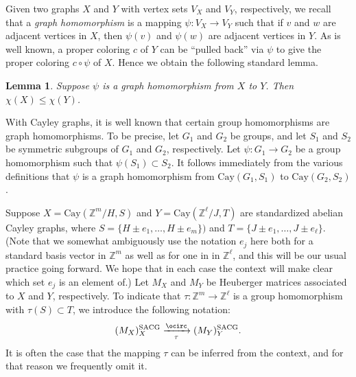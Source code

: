 \documentclass{article}
\newtheorem{Lem}[Thm]{Lemma}
\theoremstyle{definition}
\theoremstyle{remark}
\begin{document}
Given two graphs $X$ and $Y$ with vertex sets $V_X$ and $V_Y$, respectively, we recall that a \emph{graph homomorphism} is a mapping $\psi\colon V_X\to V_Y$ such that if $v$ and $w$ are adjacent vertices in $X$, then $\psi(v)$ and $\psi(w)$ are adjacent vertices in $Y$.  As is well known, a proper coloring $c$ of $Y$ can be ``pulled back'' via $\psi$ to give the proper coloring $c\circ\psi$ of $X$.  Hence we obtain the following standard lemma.

\begin{Lem}\label{lemma-pullback}
Suppose $\psi$ is a graph homomorphism from $X$ to $Y$.  Then $\chi(X)\leq \chi(Y)$.\end{Lem}

With Cayley graphs, it is well known that certain group homomorphisms are graph homomorphisms.  To be precise, let $G_1$ and $G_2$ be groups, and let $S_1$ and $S_2$ be symmetric subgroups of $G_1$ and $G_2$, respectively.  Let $\psi\colon G_1\to G_2$ be a group homomorphism such that $\psi(S_1)\subset S_2$.  It follows immediately from the various definitions that $\psi$ is a graph homomorphism from $\text{Cay}(G_1,S_1)$ to $\text{Cay}(G_2,S_2)$.

Suppose $X=\text{Cay}(\mathbb{Z}^m/H,S)$ and $Y=\text{Cay}(\mathbb{Z}^\ell/J,T)$ are standardized abelian Cayley graphs, where $S=\{H\pm e_1,\dots,H\pm e_m\})$ and $T=\{J\pm e_1,\dots,J\pm e_\ell\}$.  (Note that we somewhat ambiguously use the notation $e_j$ here both for a standard basis vector in $\mathbb{Z}^m$ as well as for one in in $\mathbb{Z}^\ell$, and this will be our usual practice going forward.  We hope that in each case the context will make clear which set $e_j$ is an element of.)  Let $M_X$ and $M_Y$ be Heuberger matrices associated to $X$ and $Y$, respectively.  To indicate that $\tau\colon \mathbb{Z}^m\to \mathbb{Z}^\ell$ is a group homomorphism with $\tau(S)\subset T$, we introduce the following notation: $$(M_X)^{\text{SACG}}_X\xrightarrow[\tau]{\ocirc}(M_Y)^{\text{SACG}}_Y.$$  It is often the case that the mapping $\tau$ can be inferred from the context, and for that reason we frequently omit it.
\end{document}
